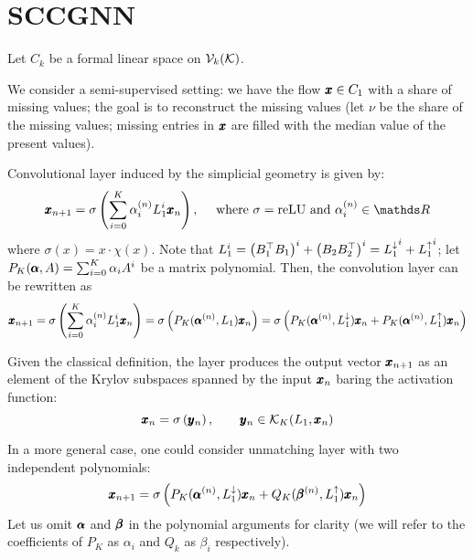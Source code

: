 \documentclass{mynotes}
\begin{document}
\section{ SCCGNN }

Let \( C_k \) be a formal linear space on \( \mathcal{V}_{k}(\mathcal{K}) \).

We consider a semi-supervised setting: we have the flow \( \pmb{x} \in C_1 \) with a share of missing values; the goal is to reconstruct the missing values (let \( \nu \) be the share of the missing values; missing entries in \( \pmb{x} \) are filled with the median value of the present values).

Convolutional layer induced by the simplicial geometry is given by:
\begin{equation*}
      \b x_{n+1} = \sigma \left( \sum_{i=0}^K \alpha_i^{(n)} L_1^i \b x_n \right), \quad \text{ where } \sigma=\mathrm{reLU} \text{ and } \alpha_i^{(n)} \in \ds R
\end{equation*}
where \(\sigma ( x ) = x \cdot \chi(x) \). Note that \( L_1^i = \left( B_1^\top B_1 \right)^i + \left( B_2 B_2^\top \right)^i = {L_{1}^{\downarrow}}^i + {L_{1}^{\uparrow}}^i \); let \( P_K( \pmb{\alpha}, A ) = \sum_{i=0}^K \alpha_i A^i \) be a matrix polynomial. Then, the convolution layer can be rewritten as
\begin{equation}
      \pmb{x}_{n+1} = \sigma \left( \sum_{i=0}^K \alpha_i^{(n)} L_1^i \pmb{x}_n \right) = \sigma \left( P_K( \pmb{\alpha}^{(n)}, L_1) \pmb{x}_n \right) = \sigma \left( P_K( \pmb{\alpha}^{(n)}, L_{1}^{\downarrow}) \pmb{x}_n + P_K( \pmb{\alpha}^{(n)}, L_{1}^{\uparrow}) \pmb{x}_n  \right) 
\end{equation}

\begin{remark} 
      Given the classical definition, the layer produces the output vector \( \pmb{x}_{n+1} \) as an element of the Krylov subspaces spanned by the input \( \pmb{x}_n \) baring the activation function:
      \begin{equation*}
            \pmb{x}_n = \sigma \left( \pmb{y}_n \right), \qquad \pmb{y}_n \in \mathcal{K}_K (L_1, \pmb{x}_n)
      \end{equation*}
\end{remark}

In a more general case, one could consider unmatching layer with two independent polynomials:
\begin{equation}
      \pmb{x}_{n+1} = \sigma \left( P_K( \pmb{\alpha}^{(n)}, L_{1}^{\downarrow}) \pmb{x}_n + Q_K( \pmb{\beta}^{(n)}, L_{1}^{\uparrow}) \pmb{x}_n  \right) 
\end{equation}
Let us omit \( \pmb{\alpha} \) and \( \pmb{\beta} \) in the polynomial arguments for clarity (we will refer to the coefficients of \( P_K \) as \( \alpha_i \) and \( Q_k \) as \( \beta_i \) respectively).
\end{document}

